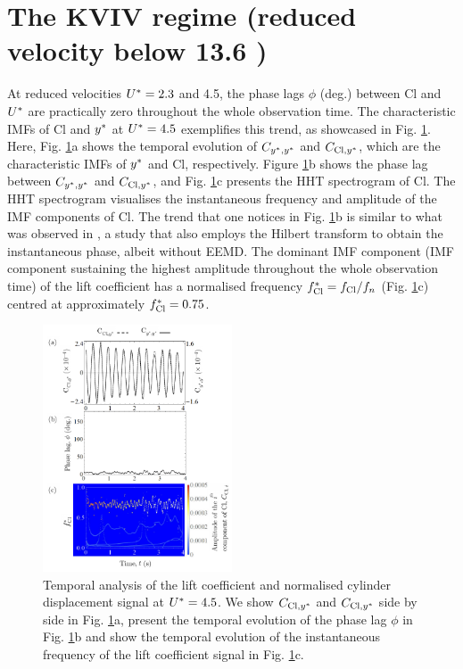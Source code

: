 \documentclass[oneside]{utmthesis}
\begin{document}
\section{The KVIV regime (reduced velocity below 13.6 )} \label{sec:phaseLag}
At reduced velocities  $U^{*} = 2.3$ and 4.5, the phase lags  $\phi$ (deg.) between Cl and  $U^{*}$ are practically zero throughout the whole observation time. The characteristic IMFs of Cl and  $y^{*}$ at $U^{*} = 4.5$ exemplifies this trend, as showcased in Fig. \ref{fig:tempAnalysisKVIV}. Here, Fig. \ref{fig:tempAnalysisKVIV}a shows the temporal evolution of $C_{y^{*},y^{*}}$ and $C_{\text{Cl},y^{*}}$, which are the characteristic IMFs of $y^{*}$ and Cl, respectively. Figure \ref{fig:tempAnalysisKVIV}b shows the phase lag between $C_{y^{*},y^{*}}$ and $C_{\text{Cl},y^{*}}$, and Fig. \ref{fig:tempAnalysisKVIV}c presents the HHT spectrogram of Cl. The HHT spectrogram visualises the instantaneous frequency and amplitude of the IMF components of Cl. The trend that one notices in Fig. \ref{fig:tempAnalysisKVIV}b is similar to what was observed in \citet{Khalak1999}, a study that also employs the Hilbert transform to obtain the instantaneous phase, albeit without EEMD. The dominant IMF component (IMF component sustaining the highest amplitude throughout the whole observation time) of the lift coefficient has a normalised frequency $f_{\text{Cl}}^{*} = f_{\text{Cl}}/f_{n}$ (Fig. \ref{fig:tempAnalysisKVIV}c) centred at approximately $f_{\text{Cl}}^{*} = 0.75$.

\begin{figure}
  \centering
  \includegraphics[width=0.5\textwidth]{figs/tempAnalysisKVIV}
  \caption{Temporal analysis of the lift coefficient and normalised cylinder displacement signal at $U^{*} = 4.5$. We show $C_{\text{Cl},y^{*}}$ and $C_{\text{Cl},y^{*}}$ side by side in Fig. \ref{fig:tempAnalysisKVIV}a, present the temporal evolution of the phase lag $\phi$ in Fig. \ref{fig:tempAnalysisKVIV}b and show the temporal evolution of the instantaneous frequency of the lift coefficient signal in Fig. \ref{fig:tempAnalysisKVIV}c.} \label{fig:tempAnalysisKVIV}
\end{figure}
\end{document}
